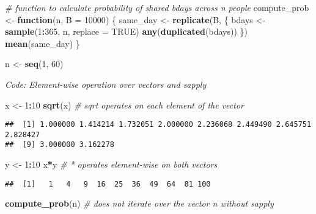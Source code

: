 \documentclass[
]{article}
\newenvironment{Shaded}{\begin{snugshade}}{\end{snugshade}}
\newcommand{\CommentTok}[1]{\textcolor[rgb]{0.56,0.35,0.01}{\textit{#1}}}
\newcommand{\ControlFlowTok}[1]{\textcolor[rgb]{0.13,0.29,0.53}{\textbf{#1}}}
\newcommand{\DataTypeTok}[1]{\textcolor[rgb]{0.13,0.29,0.53}{#1}}
\newcommand{\DecValTok}[1]{\textcolor[rgb]{0.00,0.00,0.81}{#1}}
\newcommand{\KeywordTok}[1]{\textcolor[rgb]{0.13,0.29,0.53}{\textbf{#1}}}
\newcommand{\NormalTok}[1]{#1}
\newcommand{\OperatorTok}[1]{\textcolor[rgb]{0.81,0.36,0.00}{\textbf{#1}}}
\newcommand{\OtherTok}[1]{\textcolor[rgb]{0.56,0.35,0.01}{#1}}
\newcommand{\StringTok}[1]{\textcolor[rgb]{0.31,0.60,0.02}{#1}}
\begin{document}
\begin{Shaded}
\begin{Highlighting}[]
\CommentTok{\# function to calculate probability of shared bdays across n people}
\NormalTok{compute\_prob \textless{}{-}}\StringTok{ }\ControlFlowTok{function}\NormalTok{(n, }\DataTypeTok{B =} \DecValTok{10000}\NormalTok{) \{}
\NormalTok{    same\_day \textless{}{-}}\StringTok{ }\KeywordTok{replicate}\NormalTok{(B, \{}
\NormalTok{        bdays \textless{}{-}}\StringTok{ }\KeywordTok{sample}\NormalTok{(}\DecValTok{1}\OperatorTok{:}\DecValTok{365}\NormalTok{, n, }\DataTypeTok{replace =} \OtherTok{TRUE}\NormalTok{)}
        \KeywordTok{any}\NormalTok{(}\KeywordTok{duplicated}\NormalTok{(bdays))}
\NormalTok{    \})}
    \KeywordTok{mean}\NormalTok{(same\_day)}
\NormalTok{\}}

\NormalTok{n \textless{}{-}}\StringTok{ }\KeywordTok{seq}\NormalTok{(}\DecValTok{1}\NormalTok{, }\DecValTok{60}\NormalTok{)}
\end{Highlighting}
\end{Shaded}

\emph{Code: Element-wise operation over vectors and sapply}

\begin{Shaded}
\begin{Highlighting}[]
\NormalTok{x \textless{}{-}}\StringTok{ }\DecValTok{1}\OperatorTok{:}\DecValTok{10}
\KeywordTok{sqrt}\NormalTok{(x)    }\CommentTok{\# sqrt operates on each element of the vector}
\end{Highlighting}
\end{Shaded}

\begin{verbatim}
##  [1] 1.000000 1.414214 1.732051 2.000000 2.236068 2.449490 2.645751 2.828427
##  [9] 3.000000 3.162278
\end{verbatim}

\begin{Shaded}
\begin{Highlighting}[]
\NormalTok{y \textless{}{-}}\StringTok{ }\DecValTok{1}\OperatorTok{:}\DecValTok{10}
\NormalTok{x}\OperatorTok{*}\NormalTok{y    }\CommentTok{\# * operates element{-}wise on both vectors}
\end{Highlighting}
\end{Shaded}

\begin{verbatim}
##  [1]   1   4   9  16  25  36  49  64  81 100
\end{verbatim}

\begin{Shaded}
\begin{Highlighting}[]
\KeywordTok{compute\_prob}\NormalTok{(n)    }\CommentTok{\# does not iterate over the vector n without sapply}
\end{Highlighting}
\end{Shaded}
\end{document}
